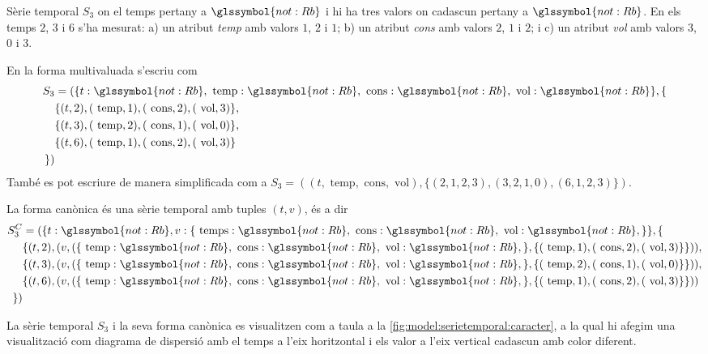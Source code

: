\begin{example}
  Sèrie temporal $S_3$ on el temps pertany a $\glssymbol{not:Rb}$ i hi ha tres
  valors on cadascun pertany a $\glssymbol{not:Rb}$. En els temps $2$, $3$ i
  $6$ s'ha mesurat: a) un atribut \emph{temp} amb valors $1$, $2$ i
  $1$; b) un atribut \emph{cons} amb valors $2$, $1$ i $2$; i c) un
  atribut \emph{vol} amb valors $3$, $0$ i $3$.



En la forma multivaluada s'escriu com
\begin{align*}
  S_3  &= ( \{t: \glssymbol{not:Rb}, \text{ temp}: \glssymbol{not:Rb}, \text{
  cons}: \glssymbol{not:Rb},\text{ vol}: \glssymbol{not:Rb} \}, \{ \\
  & \{(t,2),(\text{ temp},1) ,( \text{ cons},2),(\text{ vol},3) \}, \\
  & \{(t,3),(\text{ temp},2) ,( \text{ cons},1),(\text{ vol},0) \}, \\
  & \{(t,6),(\text{ temp},1) , (\text{ cons},2),(\text{ vol},3) \} \\
\})
\end{align*}
També es pot escriure de manera simplificada com a $S_{3} = (
(t,\text{ temp},\text{ cons},\text{ vol}),\{ (2,1,2,3), (3,2,1,0),
(6,1,2,3) \})$.

La forma canònica és una sèrie temporal amb tuples $(t,v)$, és a dir
\begin{align*}
  S^C_{3} &= ( \{t: \glssymbol{not:Rb}, v: \{ \text{ temps}:
  \glssymbol{not:Rb}, \text{ cons}: \glssymbol{not:Rb},\text{ vol}:
  \glssymbol{not:Rb},\} \}, \{ \\
  & \{(t,2), (v, ( \{ \text{ temp}: \glssymbol{not:Rb}, \text{ cons}:
  \glssymbol{not:Rb},\text{ vol}: \glssymbol{not:Rb},\}, \{ (\text{ temp},1)
  ,  (\text{ cons},2),(\text{ vol},3) \}\} )), \\
 & \{(t,3), (v, ( \{ \text{ temp}: \glssymbol{not:Rb}, \text{ cons}:
  \glssymbol{not:Rb},\text{ vol}: \glssymbol{not:Rb},\}, \{ (\text{ temp},2)
  ,  (\text{ cons},1),(\text{ vol},0) \}\} )), \\
 & \{(t,6), (v, ( \{ \text{ temp}: \glssymbol{not:Rb}, \text{ cons}:
  \glssymbol{not:Rb},\text{ vol}: \glssymbol{not:Rb},\}, \{ (\text{ temp},1)
  ,  (\text{ cons},2),(\text{ vol},3) \}\} )) \\
  \} )
\end{align*}


La sèrie temporal $S_3$ i la seva forma canònica es visualitzen com a
taula a la \autoref{fig:model:serietemporal:caracter}, a la qual hi
afegim una visualització com diagrama de dispersió amb el temps a
l'eix horitzontal i els valor a l'eix vertical cadascun amb color
diferent.



\end{example}
